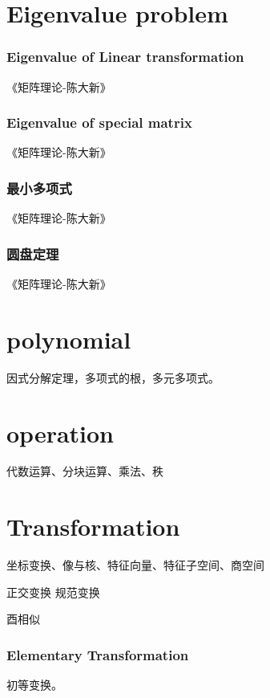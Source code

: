 \documentclass[UTF8]{../../09-Mathematics}
\begin{document}
\chapter{Eigenvalue problem}

\subsection{Eigenvalue of Linear transformation}
《矩阵理论-陈大新》

\subsection{Eigenvalue of special matrix}
《矩阵理论-陈大新》

\subsection{最小多项式}
《矩阵理论-陈大新》

\subsection{圆盘定理}

《矩阵理论-陈大新》



\chapter{polynomial}
因式分解定理，多项式的根，多元多项式。


\chapter{operation}
代数运算、分块运算、乘法、秩



\chapter{Transformation}

坐标变换、像与核、特征向量、特征子空间、商空间




正交变换
规范变换

酉相似

\subsection{Elementary Transformation}
初等变换。
\end{document}
